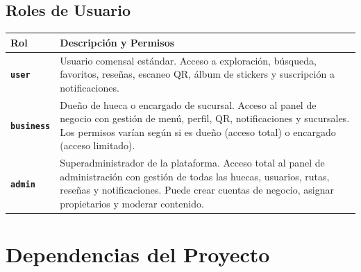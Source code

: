 \documentclass[11pt, a4paper, oneside]{report}
\begin{document}
\section{Roles de Usuario}

\begin{longtable}{>{\bfseries}p{2.5cm} p{10.5cm}}
\toprule
\textbf{Rol} & \textbf{Descripción y Permisos} \\
\midrule
\texttt{user} & Usuario comensal estándar. Acceso a exploración, búsqueda, favoritos, reseñas, escaneo QR, álbum de stickers y suscripción a notificaciones. \\
\addlinespace
\texttt{business} & Dueño de hueca o encargado de sucursal. Acceso al panel de negocio con gestión de menú, perfil, QR, notificaciones y sucursales. Los permisos varían según si es dueño (acceso total) o encargado (acceso limitado). \\
\addlinespace
\texttt{admin} & Superadministrador de la plataforma. Acceso total al panel de administración con gestión de todas las huecas, usuarios, rutas, reseñas y notificaciones. Puede crear cuentas de negocio, asignar propietarios y moderar contenido. \\
\bottomrule
\end{longtable}

\chapter{Dependencias del Proyecto}
\end{document}
